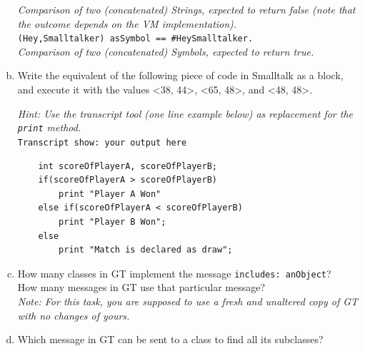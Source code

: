 \documentclass [11pt, a4wide, twoside]{article}
\begin{document}
\begin{enumerate}[a)]
{\begin{itemize}
\textit{Comparison of two (concatenated) Strings, expected to return false (note that the outcome depends on the VM implementation).}\\ \newline
\texttt{(\textquotesingle Hey\textquotesingle,\textquotesingle Smalltalker\textquotesingle) asSymbol == \#HeySmalltalker.}\\
\textit{Comparison of two (concatenated) Symbols, expected to return true.}\\ \newline
\end{itemize}
}
\item Write the equivalent of the following piece of code in Smalltalk as a block, and execute it with the values \textless38, 44\textgreater , \textless65, 48\textgreater, and \textless48, 48\textgreater.

\textit{Hint: Use the transcript tool (one line example below) as replacement for the \texttt{print} method.}\\
\texttt{Transcript show: \textquotesingle your output here\textquotesingle}

\lstset{basicstyle=\ttfamily}
\begin{lstlisting}
   	int scoreOfPlayerA, scoreOfPlayerB;
	if(scoreOfPlayerA > scoreOfPlayerB)
		print "Player A Won"	
	else if(scoreOfPlayerA < scoreOfPlayerB)
		print "Player B Won";
	else
		print "Match is declared as draw";
\end{lstlisting}
\item How many classes in GT implement the message \texttt{includes: anObject}?\\How many messages in GT use that particular message?\\
\textit{Note: For this task, you are supposed to use a fresh and unaltered copy of GT with no changes of yours.}
\item Which message in GT can be sent to a class to find all its subclasses?
\end{enumerate}
\end{document}
